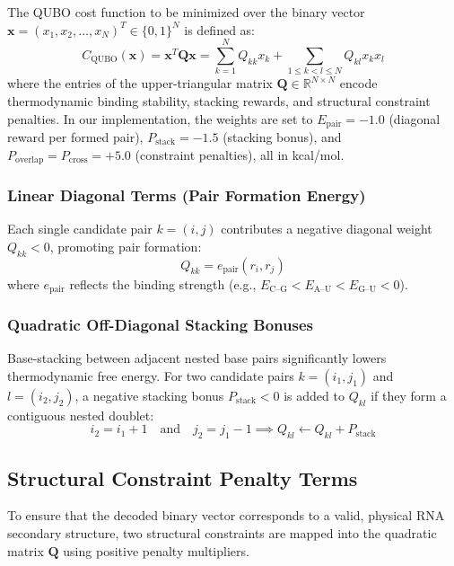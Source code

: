 \documentclass[11pt,a4paper]{article}
\begin{document}
	The QUBO cost function to be minimized over the binary vector $\mathbf{x} = (x_1, x_2, \dots, x_N)^T \in \{0, 1\}^N$ is defined as:
	\begin{equation}
		C_{\text{QUBO}}(\mathbf{x}) = \mathbf{x}^T \mathbf{Q} \mathbf{x} = \sum_{k=1}^N Q_{kk} x_k + \sum_{1 \le k < l \le N} Q_{kl} x_k x_l
	\end{equation}
	where the entries of the upper-triangular matrix $\mathbf{Q} \in \mathbb{R}^{N \times N}$ encode thermodynamic binding stability, stacking rewards, and structural constraint penalties. In our implementation, the weights are set to $E_{\text{pair}} = -1.0$ (diagonal reward per formed pair), $P_{\text{stack}} = -1.5$ (stacking bonus), and $P_{\text{overlap}} = P_{\text{cross}} = +5.0$ (constraint penalties), all in kcal/mol.
	
	\subsubsection{Linear Diagonal Terms (Pair Formation Energy)}
	Each single candidate pair $k = (i, j)$ contributes a negative diagonal weight $Q_{kk} < 0$, promoting pair formation:
	\begin{equation}
		Q_{kk} = e_{\text{pair}}(r_i, r_j)
	\end{equation}
	where $e_{\text{pair}}$ reflects the binding strength (e.g., $E_{\text{C--G}} < E_{\text{A--U}} < E_{\text{G--U}} < 0$).
	
	\subsubsection{Quadratic Off-Diagonal Stacking Bonuses}
	Base-stacking between adjacent nested base pairs significantly lowers thermodynamic free energy. For two candidate pairs $k = (i_1, j_1)$ and $l = (i_2, j_2)$, a negative stacking bonus $P_{\text{stack}} < 0$ is added to $Q_{kl}$ if they form a contiguous nested doublet:
	\begin{equation}
		i_2 = i_1 + 1 \quad \text{and} \quad j_2 = j_1 - 1 \implies Q_{kl} \gets Q_{kl} + P_{\text{stack}}
	\end{equation}
	
	\subsection{Structural Constraint Penalty Terms}
	
	To ensure that the decoded binary vector corresponds to a valid, physical RNA secondary structure, two structural constraints are mapped into the quadratic matrix $\mathbf{Q}$ using positive penalty multipliers.
	
\end{document}
